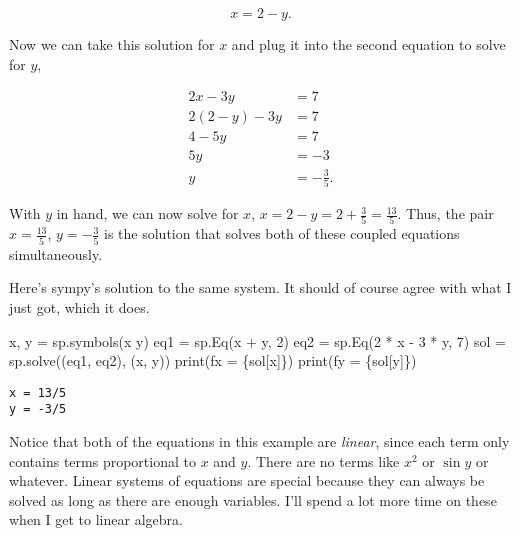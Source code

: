 \documentclass[
  letterpaper,
  DIV=11,
  numbers=noendperiod]{scrreprt}
\newenvironment{Shaded}{\begin{snugshade}}{\end{snugshade}}
\newcommand{\BuiltInTok}[1]{\textcolor[rgb]{0.00,0.23,0.31}{#1}}
\newcommand{\DecValTok}[1]{\textcolor[rgb]{0.68,0.00,0.00}{#1}}
\newcommand{\NormalTok}[1]{\textcolor[rgb]{0.00,0.23,0.31}{#1}}
\newcommand{\OperatorTok}[1]{\textcolor[rgb]{0.37,0.37,0.37}{#1}}
\newcommand{\SpecialCharTok}[1]{\textcolor[rgb]{0.37,0.37,0.37}{#1}}
\newcommand{\SpecialStringTok}[1]{\textcolor[rgb]{0.13,0.47,0.30}{#1}}
\newcommand{\StringTok}[1]{\textcolor[rgb]{0.13,0.47,0.30}{#1}}
\begin{document}
\[x = 2 - y.\]

Now we can take this solution for \(x\) and plug it into the second
equation to solve for \(y\),

\begin{align*}
2x - 3y &= 7 \\
2(2 - y) - 3y &= 7 \\
4 - 5y &= 7 \\
5y &= -3 \\
y &= -\frac{3}{5}.
\end{align*}

With \(y\) in hand, we can now solve for \(x\),
\(x = 2 - y = 2 + \frac{3}{5} = \frac{13}{5}\). Thus, the pair
\(x=\frac{13}{5}\), \(y=-\frac{3}{5}\) is the solution that solves both
of these coupled equations simultaneously.

Here's sympy's solution to the same system. It should of course agree
with what I just got, which it does.

\begin{Shaded}
\begin{Highlighting}[]
\NormalTok{x, y }\OperatorTok{=}\NormalTok{ sp.symbols(}\StringTok{\textquotesingle{}x y\textquotesingle{}}\NormalTok{)}
\NormalTok{eq1 }\OperatorTok{=}\NormalTok{ sp.Eq(x }\OperatorTok{+}\NormalTok{ y, }\DecValTok{2}\NormalTok{)}
\NormalTok{eq2 }\OperatorTok{=}\NormalTok{ sp.Eq(}\DecValTok{2} \OperatorTok{*}\NormalTok{ x }\OperatorTok{{-}} \DecValTok{3} \OperatorTok{*}\NormalTok{ y, }\DecValTok{7}\NormalTok{)}
\NormalTok{sol }\OperatorTok{=}\NormalTok{ sp.solve((eq1, eq2), (x, y))}
\BuiltInTok{print}\NormalTok{(}\SpecialStringTok{f\textquotesingle{}x = }\SpecialCharTok{\{}\NormalTok{sol[x]}\SpecialCharTok{\}}\SpecialStringTok{\textquotesingle{}}\NormalTok{)}
\BuiltInTok{print}\NormalTok{(}\SpecialStringTok{f\textquotesingle{}y = }\SpecialCharTok{\{}\NormalTok{sol[y]}\SpecialCharTok{\}}\SpecialStringTok{\textquotesingle{}}\NormalTok{)}
\end{Highlighting}
\end{Shaded}

\begin{verbatim}
x = 13/5
y = -3/5
\end{verbatim}

Notice that both of the equations in this example are \emph{linear},
since each term only contains terms proportional to \(x\) and \(y\).
There are no terms like \(x^2\) or \(\sin y\) or whatever. Linear
systems of equations are special because they can always be solved as
long as there are enough variables. I'll spend a lot more time on these
when I get to linear algebra.
\end{document}
